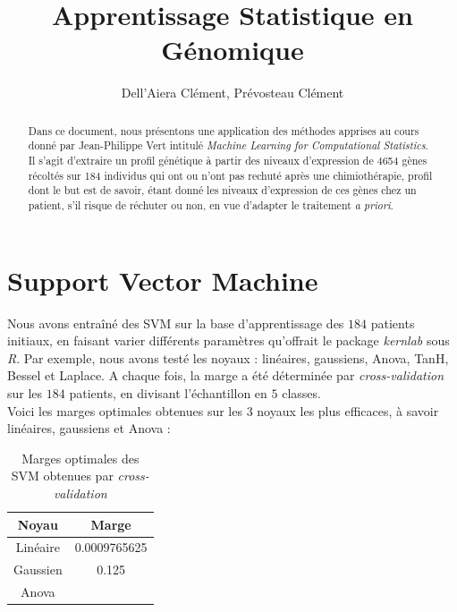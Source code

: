 \documentclass{article}
\title{Apprentissage Statistique en Génomique}
\author{Dell'Aiera Clément, Prévosteau Clément}
\date{}
\begin{document}
\maketitle

\begin{abstract}
Dans ce document, nous présentons une application des méthodes apprises au cours donné par Jean-Philippe Vert intitulé \textit{Machine Learning for Computational Statistics}. Il s'agit d'extraire un profil génétique à partir des niveaux d'expression de 4654 gènes récoltés sur 184 individus qui ont ou n'ont pas rechuté après une chimiothérapie, profil dont le but est de savoir, étant donné les niveaux d'expression de ces gènes chez un patient, s'il risque de réchuter ou non, en vue d'adapter le traitement \textit{a priori}. 
\end{abstract}

\newpage

\tableofcontents

\newpage

\section{Support Vector Machine}

Nous avons entraîné des SVM sur la base d'apprentissage des $184$ patients initiaux, en faisant varier différents paramètres qu'offrait le package \textit{kernlab} sous \textit{R}. Par exemple, nous avons testé les noyaux : linéaires, gaussiens, Anova, TanH, Bessel et Laplace. A chaque fois, la marge a été déterminée par \textit{cross-validation} sur les $184$ patients, en divisant l'échantillon en $5$ classes.\\

Voici les marges optimales obtenues sur les 3 noyaux les plus efficaces, à savoir linéaires, gaussiens et Anova :
\begin{table}[!ht]
\center
\begin{tabular}{|c|c|}
\hline
\textbf{Noyau} & \textbf{Marge}\\
\hline
Linéaire & 0.0009765625\\
\hline
Gaussien & 0.125 \\
\hline
Anova & \\
\hline
\end{tabular}
\caption{Marges optimales des SVM obtenues par \textit{cross-validation}}
\label{Margin}
\end{table}
\end{document}
